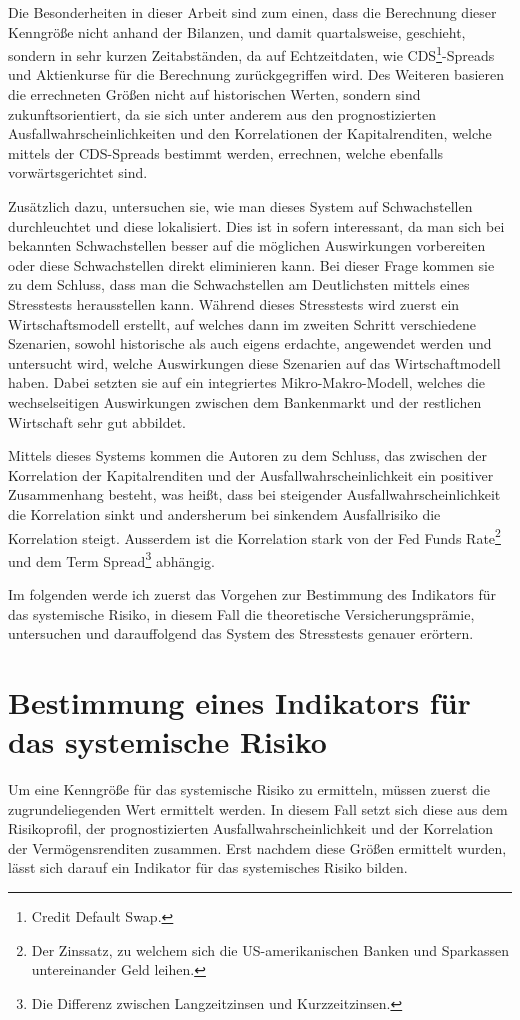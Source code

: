 \documentclass[a4paper,12pt]{scrartcl}
\begin{document}
Die Besonderheiten in dieser Arbeit sind zum einen, dass die Berechnung dieser Kenngröße nicht anhand der Bilanzen, und damit quartalsweise, geschieht, sondern in sehr kurzen Zeitabständen, da auf Echtzeitdaten, wie CDS\footnote{Credit Default Swap.}-Spreads und Aktienkurse für die Berechnung zurückgegriffen wird. Des Weiteren basieren die errechneten Größen nicht auf historischen Werten, sondern sind zukunftsorientiert, da sie sich unter anderem aus den prognostizierten Ausfallwahrscheinlichkeiten und den Korrelationen der Kapitalrenditen, welche mittels der CDS-Spreads bestimmt werden, errechnen, welche ebenfalls vorwärtsgerichtet sind.

Zusätzlich dazu, untersuchen sie, wie man dieses System auf Schwachstellen durchleuchtet und diese lokalisiert. Dies ist in sofern interessant, da man sich bei bekannten Schwachstellen besser auf die möglichen Auswirkungen vorbereiten  oder diese Schwachstellen direkt eliminieren kann. 
Bei dieser Frage kommen sie zu dem Schluss, dass man die Schwachstellen am Deutlichsten mittels eines Stresstests herausstellen kann. Während dieses Stresstests wird zuerst ein Wirtschaftsmodell erstellt, auf welches dann im zweiten Schritt verschiedene Szenarien, sowohl historische als auch eigens erdachte, angewendet werden und untersucht wird, welche Auswirkungen diese Szenarien auf das Wirtschaftmodell haben. Dabei setzten sie auf ein integriertes Mikro-Makro-Modell, welches die wechselseitigen Auswirkungen zwischen dem Bankenmarkt und der restlichen Wirtschaft sehr gut abbildet.

Mittels dieses Systems kommen die Autoren zu dem Schluss, das zwischen der Korrelation der Kapitalrenditen und der Ausfallwahrscheinlichkeit ein positiver Zusammenhang besteht, was heißt, dass bei steigender Ausfallwahrscheinlichkeit die Korrelation sinkt und andersherum bei sinkendem Ausfallrisiko die Korrelation steigt. Ausserdem ist die Korrelation stark von der Fed Funds Rate\footnote{Der Zinssatz, zu welchem sich die US-amerikanischen Banken und Sparkassen untereinander Geld leihen.} und dem Term Spread\footnote{Die Differenz zwischen Langzeitzinsen und Kurzzeitzinsen.} abhängig.

Im folgenden werde ich zuerst das Vorgehen zur Bestimmung des Indikators für das systemische Risiko, in diesem Fall die theoretische Versicherungsprämie, untersuchen und darauffolgend das System des Stresstests genauer erörtern.
\newpage

\section{Bestimmung eines Indikators für das systemische Risiko}
Um eine Kenngröße für das systemische Risiko zu ermitteln, müssen zuerst die zugrundeliegenden Wert ermittelt werden. In diesem Fall setzt sich diese aus dem Risikoprofil, der prognostizierten Ausfallwahrscheinlichkeit und der Korrelation der Vermögensrenditen zusammen. Erst nachdem diese Größen ermittelt wurden, lässt sich darauf ein Indikator für das systemisches Risiko bilden.
\end{document}
